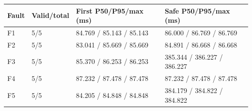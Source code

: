 \begin{tabular}{@{}llll@{}}
\toprule
Fault & Valid/total & First P50/P95/max (ms) & Safe P50/P95/max (ms) \\
\midrule
F1 & 5/5 & 84.769 / 85.143 / 85.143 & 86.000 / 86.769 / 86.769 \\
F2 & 5/5 & 83.041 / 85.669 / 85.669 & 84.891 / 86.668 / 86.668 \\
F3 & 5/5 & 85.370 / 86.253 / 86.253 & 385.344 / 386.227 / 386.227 \\
F4 & 5/5 & 87.232 / 87.478 / 87.478 & 87.232 / 87.478 / 87.478 \\
F5 & 5/5 & 84.205 / 84.848 / 84.848 & 384.179 / 384.822 / 384.822 \\
\bottomrule
\end{tabular}
